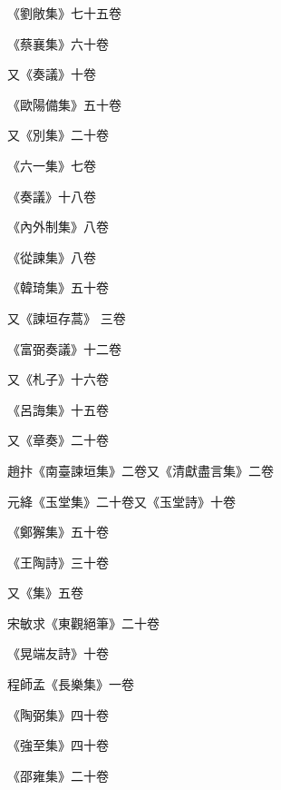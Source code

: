 \begin{pinyinscope}
 《劉敞集》七十五卷



 《蔡襄集》六十卷



 又《奏議》十卷



 《歐陽備集》五十卷



 又《別集》二十卷



 《六一集》七卷



 《奏議》十八卷



 《內外制集》八卷



 《從諫集》八卷



 《韓琦集》五十卷



 又《諫垣存蒿》
 三卷



 《富弼奏議》十二卷



 又《札子》十六卷



 《呂誨集》十五卷



 又《章奏》二十卷



 趙抃《南臺諫垣集》二卷又《清獻盡言集》二卷



 元絳《玉堂集》二十卷又《玉堂詩》十卷



 《鄭獬集》五十卷



 《王陶詩》三十卷



 又《集》五卷



 宋敏求《東觀絕筆》二十卷



 《晃端友詩》十卷



 程師孟《長樂集》一卷



 《陶弼集》四十卷



 《強至集》四十卷



 《邵雍集》二十卷




\end{pinyinscope}
